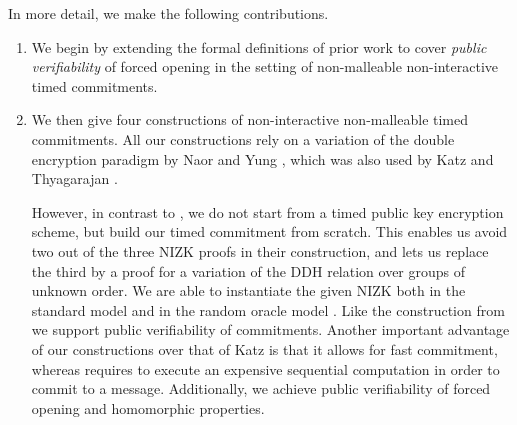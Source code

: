 In more detail, we make the following contributions.
\begin{enumerate}
\item {We begin by extending the formal definitions of prior work to cover \emph{public verifiability} of forced opening %
in the setting of non-malleable non-interactive timed commitments.} 
\item We then give four constructions of non-interactive non-malleable timed commitments. All our constructions rely on a variation of the double encryption paradigm by Naor and Yung \cite{STOC:NaoYun90}, which was also used by Katz \etal \cite{TCC:KatLosXu20} and {Thyagarajan \etal \cite{CCS:TCLM21}}. 

However, in contrast to \cite{TCC:KatLosXu20}, we do not start from a timed public key encryption scheme, but build our timed commitment from scratch. This enables us avoid two out of the three NIZK proofs in their construction, and lets us replace the third by a proof for a variation of the DDH relation over groups of unknown order. We are able to instantiate the given NIZK both in the standard model and in the random oracle model \cite{CCS:BelRog93}. Like the construction from \cite{TCC:KatLosXu20} we support public verifiability of commitments. Another important advantage of our constructions over that of Katz \etal \cite{TCC:KatLosXu20} is that it allows for fast commitment, whereas \cite{TCC:KatLosXu20} requires {to execute an expensive sequential computation in order to commit to a message}. 
Additionally, we achieve public verifiability of forced opening and homomorphic properties.
\end{enumerate}

